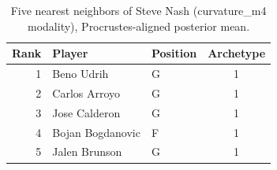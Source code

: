 \begin{table}[htbp]
  \centering\small
  \begin{tabular}{rllc}
    \toprule
    Rank & Player & Position & Archetype \\
    \midrule
    1 & Beno Udrih & G & 1 \\
    2 & Carlos Arroyo & G & 1 \\
    3 & Jose Calderon & G & 1 \\
    4 & Bojan Bogdanovic & F & 1 \\
    5 & Jalen Brunson & G & 1 \\
    \bottomrule
  \end{tabular}
  \caption{Five nearest neighbors of Steve Nash (curvature_m4 modality), Procrustes-aligned posterior mean.}
  \label{tab:Steve_Nash_neighbors_curvature_m4}
\end{table}


